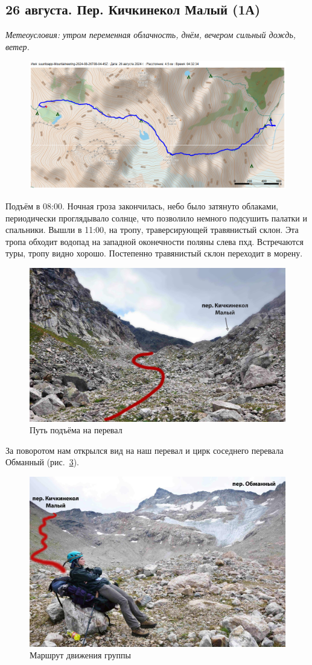 \subsection{26 августа. Пер. Кичкинекол Малый (1А)}
\textit{Метеоусловия: утром переменная облачность, днём, вечером сильный дождь, ветер.}

\begin{figure}[h!]
	\centering
	\includegraphics[angle=0, width=0.7\linewidth]{../pics/mini_maps/26}
	\label{fig:mini_26}
\end{figure}

Подъём в 08:00. Ночная гроза закончилась, небо было затянуто облаками, периодически проглядывало солнце, что позволило немного подсушить палатки и спальники. Вышли в 11:00, на тропу, траверсирующей травянистый склон. Эта тропа обходит водопад на западной оконечности поляны слева пхд. Встречаются туры, тропу видно хорошо. 
Постепенно травянистый склон переходит в морену.

\begin{figure}[h!]
	\centering
	\includegraphics[width=0.7\linewidth]{../pics/DSC_0221.JPG}
	\caption{Путь подъёма на перевал}
	\label{fig:DSC_0221}
\end{figure}
 
За поворотом нам открылся вид на наш перевал и цирк соседнего перевала Обманный (рис.~\ref{fig:DSC_0226}).
 
\begin{figure}[h!]
	\centering
	\includegraphics[width=0.7\linewidth]{../pics/DSC_0226}
	\caption{Маршрут движения группы}
	\label{fig:DSC_0226}
\end{figure}


